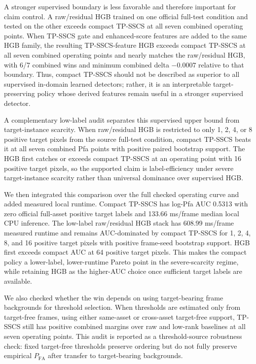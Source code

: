 \documentclass[journal]{IEEEtran}
\begin{document}
A stronger supervised boundary is less favorable and therefore important for claim control. A raw/residual HGB trained on one official full-test condition and tested on the other exceeds compact TP-SSCS at all seven combined operating points. When TP-SSCS gate and enhanced-score features are added to the same HGB family, the resulting TP-SSCS-feature HGB exceeds compact TP-SSCS at all seven combined operating points and nearly matches the raw/residual HGB, with 6/7 combined wins and minimum combined delta $-0.0007$ relative to that boundary. Thus, compact TP-SSCS should not be described as superior to all supervised in-domain learned detectors; rather, it is an interpretable target-preserving policy whose derived features remain useful in a stronger supervised detector.

A complementary low-label audit separates this supervised upper bound from target-instance scarcity. When raw/residual HGB is restricted to only 1, 2, 4, or 8 positive target pixels from the source full-test condition, compact TP-SSCS beats it at all seven combined Pfa points with positive paired bootstrap support. The HGB first catches or exceeds compact TP-SSCS at an operating point with 16 positive target pixels, so the supported claim is label-efficiency under severe target-instance scarcity rather than universal dominance over supervised HGB.

We then integrated this comparison over the full checked operating curve and added measured local runtime. Compact TP-SSCS has log-Pfa AUC 0.5313 with zero official full-asset positive target labels and 133.66 ms/frame median local CPU inference. The low-label raw/residual HGB stack has 608.99 ms/frame measured runtime and remains AUC-dominated by compact TP-SSCS for 1, 2, 4, 8, and 16 positive target pixels with positive frame-seed bootstrap support. HGB first exceeds compact AUC at 64 positive target pixels. This makes the compact policy a lower-label, lower-runtime Pareto point in the severe-scarcity regime, while retaining HGB as the higher-AUC choice once sufficient target labels are available.

We also checked whether the win depends on using target-bearing frame backgrounds for threshold selection. When thresholds are estimated only from target-free frames, using either same-asset or cross-asset target-free support, TP-SSCS still has positive combined margins over raw and low-rank baselines at all seven operating points. This audit is reported as a threshold-source robustness check: fixed target-free thresholds preserve ordering but do not fully preserve empirical $P_{\mathrm{FA}}$ after transfer to target-bearing backgrounds.
\end{document}
